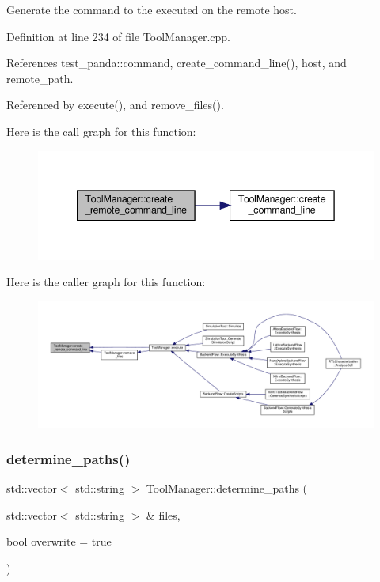 Generate the command to the executed on the remote host. 



Definition at line 234 of file Tool\+Manager.\+cpp.



References test\+\_\+panda\+::command, create\+\_\+command\+\_\+line(), host, and remote\+\_\+path.



Referenced by execute(), and remove\+\_\+files().

Here is the call graph for this function\+:
\nopagebreak
\begin{figure}[H]
\begin{center}
\leavevmode
\includegraphics[width=342pt]{dc/dc5/classToolManager_aaa21b7a46e2bc7c2d0842107224f54b4_cgraph}
\end{center}
\end{figure}
Here is the caller graph for this function\+:
\nopagebreak
\begin{figure}[H]
\begin{center}
\leavevmode
\includegraphics[width=350pt]{dc/dc5/classToolManager_aaa21b7a46e2bc7c2d0842107224f54b4_icgraph}
\end{center}
\end{figure}
\mbox{\label{classToolManager_a7973f93d141a5e61f42cf681c97c59e5}} 
\subsubsection{\texorpdfstring{determine\+\_\+paths()}{determine\_paths()}\hspace{0.1cm}{\footnotesize\ttfamily [1/2]}}
{\footnotesize\ttfamily std\+::vector$<$ std\+::string $>$ Tool\+Manager\+::determine\+\_\+paths (\begin{DoxyParamCaption}\item[{std\+::vector$<$ std\+::string $>$ \&}]{files,  }\item[{bool}]{overwrite = {\ttfamily true} }\end{DoxyParamCaption})}



